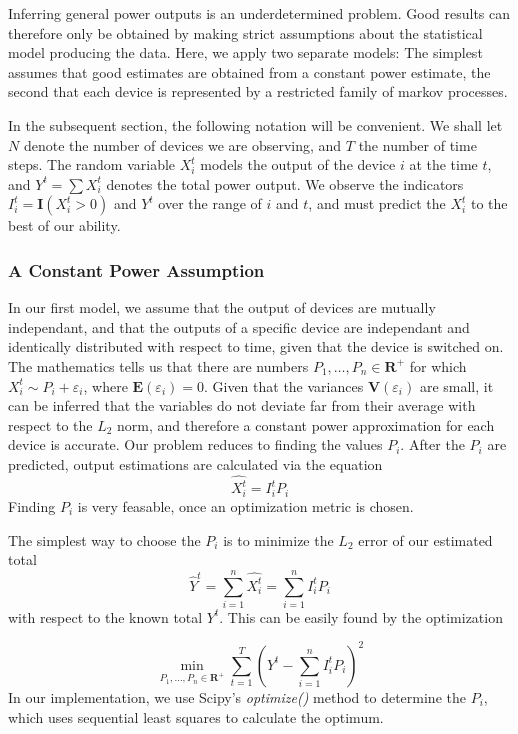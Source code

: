 \documentclass{article}
\begin{document}
Inferring general power outputs is an underdetermined problem. Good results can therefore only be obtained by making strict assumptions about the statistical model producing the data. Here, we apply two separate models: The simplest assumes that good estimates are obtained from a constant power estimate, the second that each device is represented by a restricted family of markov processes.

In the subsequent section, the following notation will be convenient. We shall let $N$ denote the number of devices we are observing, and $T$ the number of time steps. The random variable $X_i^t$ models the output of the device $i$ at the time $t$, and $Y^t = \sum X_i^t$ denotes the total power output. We observe the indicators $I_i^t = \mathbf{I}(X_i^t > 0)$ and $Y^t$ over the range of $i$ and $t$, and must predict the $X_i^t$ to the best of our ability.

\subsubsection{A Constant Power Assumption}

In our first model, we assume that the output of devices are mutually independant, and that the outputs of a specific device are independant and identically distributed with respect to time, given that the device is switched on. The mathematics tells us that there are numbers $P_1, \dots, P_n \in \mathbf{R}^+$ for which $X_i^t \sim P_i + \varepsilon_i$, where $\mathbf{E}(\varepsilon_i) = 0$. Given that the variances $\mathbf{V}(\varepsilon_i)$ are small, it can be inferred that the variables do not deviate far from their average with respect to the $L_2$ norm, and therefore a constant power approximation for each device is accurate. Our problem reduces to finding the values $P_i$. After the $P_i$ are predicted, output estimations are calculated via the equation
%
\[ \hat{X_i^t} = I_i^t P_i \]
%
Finding $P_i$ is very feasable, once an optimization metric is chosen.

The simplest way to choose the $P_i$ is to minimize the $L_2$ error of our estimated total
%
\[ \hat{Y}^t = \sum_{i = 1}^n \hat{X_i^t} = \sum_{i = 1}^n I_i^t P_i \]
%
with respect to the known total $Y^t$. This can be easily found by the optimization

%
\[ \min_{P_1, \dots, P_n \in \mathbf{R}^+} \sum_{t = 1}^T \left( Y^t - \sum_{i = 1}^n I_i^t P_i \right)^2 \]
%
In our implementation, we use Scipy's {\it optimize()} method to determine the $P_i$, which uses sequential least squares to calculate the optimum.
\end{document}
